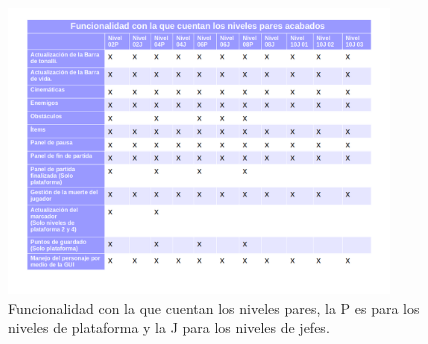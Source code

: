 		\begin{figure}[h]
    			\centering
    			\includegraphics[width=0.9\textwidth]{04ResultadosObetnidos/imagenes/funcionalidadPares.png}
    			\caption{Funcionalidad con la que cuentan los niveles pares, la P es 
    			para los niveles de plataforma y la J para los niveles de jefes.}
    			\label{fig:NivelesPares}
		\end{figure}
